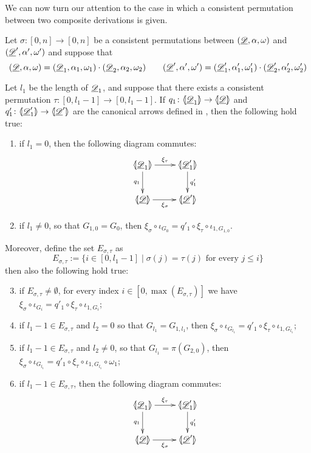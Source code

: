 We can now turn our attention to the case in which a consistent permutation between two composite derivations is given.

\begin{lemma}\label{prop:uniqu}
	Let $\sigma\colon [0,n]\to [0,n]$ be a consistent permutations between $(\underline{\mathscr{D}}, \alpha, \omega)$ and $(\underline{\mathscr{D}}', \alpha', \omega')$ and suppose that 
	\[(\underline{\mathscr{D}}, \alpha, \omega)=(\underline{\mathscr{D}}_1, \alpha_1, \omega_1) \cdot (\underline{\mathscr{D}}_2, \alpha_2, \omega_2) \qquad (\underline{\mathscr{D}}', \alpha', \omega')=(\underline{\mathscr{D}}'_1, \alpha'_1, \omega'_1) \cdot (\underline{\mathscr{D}}'_2, \alpha'_2, \omega'_2) \]
	
	 Let $l_1$ be the length of $\underline{\mathscr{D}}_1$, and suppose that there exists a consistent permutation $\tau:[0,l_1-1]\to [0, l_1-1]$.  If $q_1\colon \langle \hspace{-1.85pt}[ \underline{\mathscr{D}}_1]\hspace{-1.85pt}\rangle \to \langle \hspace{-1.85pt}[ \underline{\mathscr{D}}]\hspace{-1.85pt}\rangle$  and $q'_1\colon \langle \hspace{-1.85pt}[ \underline{\mathscr{D}}'_1]\hspace{-1.85pt}\rangle \to \langle \hspace{-1.85pt}[ \underline{\mathscr{D}}']\hspace{-1.85pt}\rangle$ are the canonical arrows defined in , then the following hold true:
	\begin{enumerate}
	\item  if $l_1=0$, then the following diagram commutes:
		\[\xymatrix{\lpro \der{D}_1\rpro \ar[r]^{\xi_\tau} \ar[d]_{q_1}& \lpro \der{D}'_1 \ar[d]^{q'_1}\rpro\\ \lpro \der{D}\rpro \ar[r]_{\xi_\sigma} & \lpro \der{D}'\rpro } \]
	\item if $l_1\neq 0$, so that $G_{1,0}=G_0$, then $\xi_\sigma \circ \iota_{G_0} = q'_1\circ \xi_{\tau} \circ  \iota_{1, G_{1,0}}$.
	\end{enumerate}
	
	Moreover, define the set $E_{\sigma, \tau}$ as
	\[E_{\sigma, \tau}:=\{i\in  [0, l_1-1] \mid \sigma(j)=\tau(j) \text{ for every } j \leq i \}\]
	then also the following hold true:
	\begin{enumerate}
		\setcounter{enumi}{2}
	\item  if $E_{\sigma, \tau}\neq \emptyset$,  for every index $i\in [0, \max(E_{\sigma, \tau})]$ we have 
	$\xi_\sigma \circ \iota_{G_i}=q'_1 \circ \xi_{\tau} \circ \iota_{1, G_i}$;
	\item if $l_1-1\in E_{\sigma, \tau}$ and $l_2=0$ so that  $G_{l_1}=G_{1, l_1}$, then 
	$\xi_\sigma \circ \iota_{G_{l_1}}=q'_1 \circ \xi_{\tau} \circ \iota_{1, G_{l_1}}$;
	\item if $l_1-1\in E_{\sigma, \tau}$ and $l_2\neq 0$, so that $G_{l_1}=\pi(G_{2,0})$, then 
	$\xi_\sigma \circ \iota_{G_{l_1}}=q'_1 \circ \xi_{\tau} \circ \iota_{1, G_{l_1}}\circ \omega_1$;
	\item if $l_1-1\in E_{\sigma, \tau}$, then the following diagram commutes:
	\[\xymatrix{\lpro \der{D}_1\rpro \ar[r]^{\xi_\tau} \ar[d]_{q_1}& \lpro \der{D}'_1 \ar[d]^{q'_1}\rpro\\ \lpro \der{D}\rpro \ar[r]_{\xi_\sigma} & \lpro \der{D}'\rpro } \]
	\end{enumerate}
\end{lemma}
